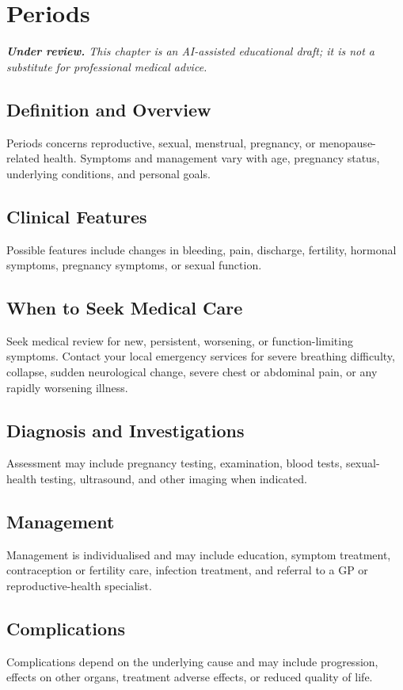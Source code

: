 \chapter{Periods}

\medskip
\noindent\textit{\textbf{Under review.} This chapter is an AI-assisted educational draft; it is not a substitute for professional medical advice.}

\section*{Definition and Overview}
Periods concerns reproductive, sexual, menstrual, pregnancy, or menopause-related health. Symptoms and management vary with age, pregnancy status, underlying conditions, and personal goals.

\section*{Clinical Features}
Possible features include changes in bleeding, pain, discharge, fertility, hormonal symptoms, pregnancy symptoms, or sexual function.

\section*{When to Seek Medical Care}
Seek medical review for new, persistent, worsening, or function-limiting symptoms. Contact your local emergency services for severe breathing difficulty, collapse, sudden neurological change, severe chest or abdominal pain, or any rapidly worsening illness.

\section*{Diagnosis and Investigations}
Assessment may include pregnancy testing, examination, blood tests, sexual-health testing, ultrasound, and other imaging when indicated.

\section*{Management}
Management is individualised and may include education, symptom treatment, contraception or fertility care, infection treatment, and referral to a GP or reproductive-health specialist.

\section*{Complications}
Complications depend on the underlying cause and may include progression, effects on other organs, treatment adverse effects, or reduced quality of life.

